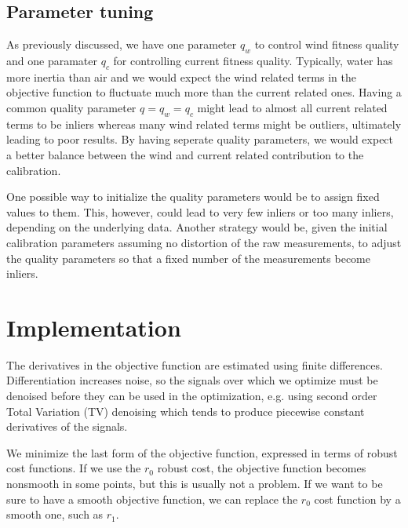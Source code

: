 \documentclass{article}
\newcommand{\quality}[1]{q_{#1}}
\begin{document}
\subsection{Parameter tuning}
As previously discussed, we have one parameter $\quality{w}$ to control wind fitness quality and one paramater $\quality{c}$ for controlling current fitness quality. Typically, water has more inertia than air and we would expect the wind related terms in the objective function to fluctuate much more than the current related ones. Having a common quality parameter $q = \quality{w} = \quality{c}$ might lead to almost all current related terms to be inliers whereas many wind related terms might be outliers, ultimately leading to poor results. By having seperate quality parameters, we would expect a better balance between the wind and current related contribution to the calibration.

One possible way to initialize the quality parameters would be to assign fixed values to them. This, however, could lead to very few inliers or too many inliers, depending on the underlying data. Another strategy would be, given the initial calibration parameters assuming no distortion of the raw measurements, to adjust the quality parameters so that a fixed number of the measurements become inliers.
\section{Implementation}
The derivatives in the objective function are estimated using finite differences. Differentiation increases noise, so the signals over which we optimize must be denoised before they can be used in the optimization, e.g. using second order Total Variation (TV) denoising which tends to produce piecewise constant derivatives of the signals.

We minimize the last form of the objective function, expressed in terms of robust cost functions. If we use the $r_0$ robust cost, the objective function becomes nonsmooth in some points, but this is usually not a problem. If we want to be sure to have a smooth objective function, we can replace the $r_0$ cost function by a smooth one, such as $r_1$.
\end{document}
